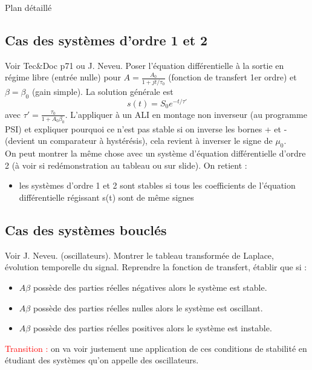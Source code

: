 \begin{reportBlock}{Plan détaillé}
  \subsection{Cas des systèmes d'ordre 1 et 2}
  Voir Tec\&Doc p71 ou J. Neveu. Poser l'équation différentielle à la sortie en régime libre (entrée nulle) pour $A=\frac{A_0}{1+jt/\tau_0}$  (fonction de transfert 1er ordre) et $\beta=\beta_0$ (gain simple). La solution générale est 
  \begin{equation}
      s(t) = S_0e^{-t/\tau'}
  \end{equation}
  avec $\tau'=\frac{\tau_0}{1+A_0\beta_0}$. L'appliquer à un ALI en montage non inverseur (au programme PSI) et expliquer pourquoi ce n'est pas stable si on inverse les bornes + et - (devient un comparateur à hystérésis), cela revient à inverser le signe de $\mu_0$.\\
  On peut montrer la même chose avec un système d'équation différentielle d'ordre 2 (à voir si redémonstration au tableau ou sur slide). On retient :
  \begin{itemize}
      \item les systèmes d'ordre 1 et 2 sont stables si tous les coefficients de l'équation différentielle régissant s(t) sont de même signes
  \end{itemize}

  \subsection{Cas des systèmes bouclés}
  Voir J. Neveu. (oscillateurs). Montrer le tableau transformée de Laplace, évolution temporelle du signal. Reprendre la fonction de transfert, établir que si :
  \begin{itemize}
      \item $A\beta$ possède des parties réelles négatives alors le système est stable.
      \item $A\beta$ possède des parties réelles nulles alors le système est oscillant.
      \item $A\beta$ possède des parties réelles positives alors le système est instable.
  \end{itemize}
  
  \textcolor{red}{Transition :} on va voir justement une application de ces conditions de stabilité en étudiant des systèmes qu'on appelle des oscillateurs. 

\end{reportBlock}
